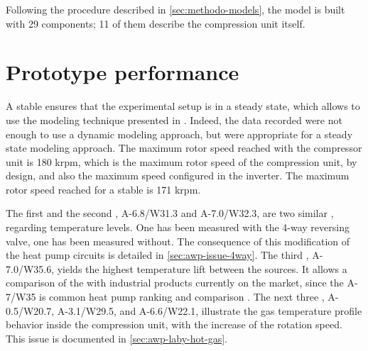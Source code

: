 Following the procedure described in \cref{sec:methodo-models}, the
model is built with 29 components; 11 of them describe the compression
unit itself.

\section{Prototype performance}
\label{sec:awp-perfs}

A stable \OP{} ensures that the
experimental setup is in a steady state, which allows to use the
modeling technique presented in . Indeed,
the data recorded were not enough to use a dynamic modeling approach,
but were appropriate for a steady state modeling approach. The maximum
rotor speed reached with the compressor unit is 180 krpm, which is the
maximum rotor speed of the compression unit, by design, and also the
maximum speed configured in the inverter. The maximum rotor speed
reached for a stable \OP{} is 171 krpm.

The first and the second \OP{}, A-6.8/W31.3 and A-7.0/W32.3, are two
similar \OP{}, regarding temperature
levels. One has been measured with the 4-way reversing valve, one has
been measured without. The consequence of this modification of the
heat pump circuits is detailed in \cref{sec:awp-issue-4way}. The third
\OP{}, A-7.0/W35.6, yields the
highest temperature lift between the sources. It allows a comparison
of the \AWP{} with industrial products currently on the market, since
the \OP{} A-7/W35 is common \OP{} heat pump ranking and
comparison \citep{EN-14511-3}. The next three \OP{}, A-0.5/W20.7, A-3.1/W29.5,
and A-6.6/W22.1, illustrate the gas temperature profile behavior
inside the compression unit, with the increase of the rotation
speed. This issue is documented in \cref{sec:awp-laby-hot-gas}.

